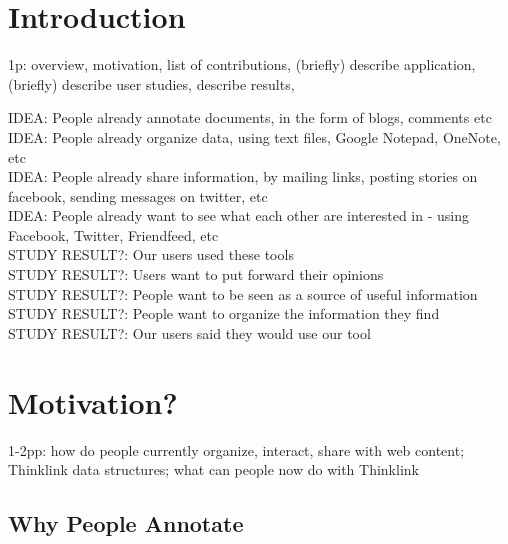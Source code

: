 \documentclass{chi2009}
\newcommand{\idea}[1]{{\color{blue} IDEA: #1}\\}
\newcommand{\studyresult}[1]{{\color{red} STUDY RESULT?: #1}\\}
\begin{document}
\section{Introduction}
1p:  
overview, 
motivation,
list of contributions,
(briefly) describe application,
(briefly) describe user studies,
describe results,

% 
% 
% 
% 





\idea{People already annotate documents, in the form of blogs, comments etc}

\idea{People already organize data, using text files, Google Notepad, OneNote, etc}

\idea{People already share information, by mailing links, posting stories on facebook, sending messages on twitter, etc}

\idea{People already want to see what each other are interested in - using Facebook, Twitter, Friendfeed, etc}

\studyresult{Our users used these tools}

\studyresult{Users want to put forward their opinions}

\studyresult{People want to be seen as a source of useful information}

\studyresult{People want to organize the information they find}

\studyresult{Our users said they would use our tool}


\section{Motivation?}
1-2pp: 
how do people currently organize, interact, share with web content; 
Thinklink data structures; 
what can people now do with Thinklink

\subsection{Why People Annotate}
\end{document}
